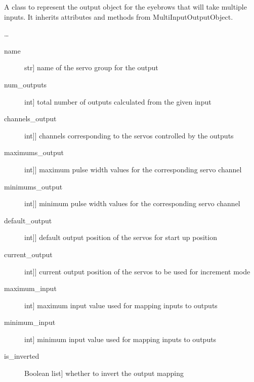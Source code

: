 \documentclass[letterpaper,10pt,english]{sphinxmanual}
\begin{document}
\begin{fulllineitems}
\label{\detokenize{specific:EyebrowsOutput.EyebrowsOutput}}
\sphinxAtStartPar
A class to represent the output object for the eyebrows that will take multiple inputs.
It inherits attributes and methods from MultiInputOutputObject.

\sphinxAtStartPar
…
\begin{description}
\item[{name}] \leavevmode{[}str{]}
\sphinxAtStartPar
name of the servo group for the output

\item[{num\_outputs}] \leavevmode{[}int{]}
\sphinxAtStartPar
total number of outputs calculated from the given input

\item[{channels\_output}] \leavevmode{[}{[}int{]}{]}
\sphinxAtStartPar
channels corresponding to the servos controlled by the outputs

\item[{maximums\_output}] \leavevmode{[}{[}int{]}{]}
\sphinxAtStartPar
maximum pulse width values for the corresponding servo channel

\item[{minimums\_output}] \leavevmode{[}{[}int{]}{]}
\sphinxAtStartPar
minimum pulse width values for the corresponding servo channel

\item[{default\_output}] \leavevmode{[}{[}int{]}{]}
\sphinxAtStartPar
default output position of the servos for start up position

\item[{current\_output}] \leavevmode{[}{[}int{]}{]}
\sphinxAtStartPar
current output position of the servos to be used for increment mode

\item[{maximum\_input}] \leavevmode{[}int{]}
\sphinxAtStartPar
maximum input value used for mapping inputs to outputs

\item[{minimum\_input}] \leavevmode{[}int{]}
\sphinxAtStartPar
minimum input value used for mapping inputs to outputs

\item[{is\_inverted}] \leavevmode{[}Boolean list{]}
\sphinxAtStartPar
whether to invert the output mapping


\end{description}
\end{fulllineitems}
\end{document}
